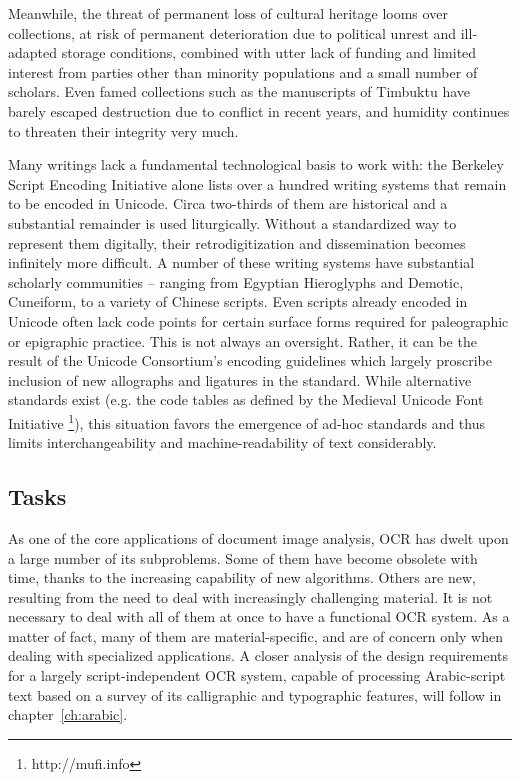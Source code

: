 Meanwhile, the threat of permanent loss of cultural heritage looms over
collections, at risk of permanent deterioration due to political unrest and
ill-adapted storage conditions, combined with utter lack of funding and limited
interest from parties other than minority populations and a small number of
scholars. Even famed collections such as the manuscripts of Timbuktu have
barely escaped destruction due to conflict in recent years, and humidity
continues to threaten their integrity very much.

Many writings lack a fundamental technological basis to work with: the Berkeley
Script Encoding Initiative alone lists over a hundred writing systems that
remain to be encoded in Unicode. Circa two-thirds of them are historical and a
substantial remainder is used liturgically. Without a standardized way to
represent them digitally, their retrodigitization and dissemination becomes
infinitely more difficult. A number of these writing systems have substantial
scholarly communities – ranging from Egyptian Hieroglyphs and Demotic,
Cuneiform, to a variety of Chinese scripts. Even scripts already encoded in
Unicode often lack code points for certain surface forms required for
paleographic or epigraphic practice. This is not always an oversight. Rather,
it can be the result of the Unicode Consortium’s encoding guidelines which
largely proscribe inclusion of new allographs and ligatures in the standard.
While alternative standards exist (e.g. the code tables as defined by the
Medieval Unicode Font Initiative \footnote{http://mufi.info}), this situation
favors the emergence of ad-hoc standards and thus limits interchangeability and
machine-readability of text considerably.

\subsection{Tasks}

As one of the core applications of document image analysis, OCR has dwelt upon
a large number of its subproblems. Some of them have become obsolete with time,
thanks to the increasing capability of new algorithms. Others are new,
resulting from the need to deal with increasingly challenging material. It is
not necessary to deal with all of them at once to have a functional OCR system.
As a matter of fact, many of them are material-specific, and are of concern
only when dealing with specialized applications. A closer analysis of the
design requirements for a largely script-independent OCR system, capable of
processing Arabic-script text based on a survey of its calligraphic and
typographic features, will follow in chapter~\ref{ch:arabic}.

